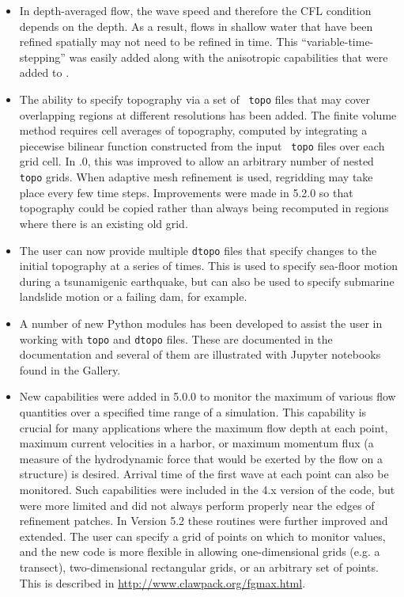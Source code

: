 \begin{itemize}
\item In depth-averaged flow, the wave speed and therefore the CFL
condition depends on the depth.  As a result, flows in shallow water
that have been refined spatially may not need to be refined in time.
This ``variable-time-stepping'' was easily added along with the anisotropic
capabilities that were added to \amrclaw.
\item The ability to specify topography via a set of {\tt
topo} files that may cover overlapping regions at different resolutions has been added.
 The finite volume method requires cell averages of topography, computed by
integrating a piecewise bilinear function constructed from the input {\tt
topo} files over each grid cell.  In .0, this was improved to
allow an arbitrary number of nested {\tt topo} grids.
When adaptive mesh refinement is used,
regridding may take place every few time steps.  Improvements were made
in 5.2.0 so that topography could be copied rather than always being
recomputed in regions where there is an existing old grid.

\item The user can now provide multiple  {\tt dtopo} files that
specify changes to the
initial topography at a series of times.  This is used to specify sea-floor
motion during a tsunamigenic earthquake, but can also be used to specify
submarine landslide motion or a failing dam, for example.

\item A number of new Python modules has been developed to assist the user
in working with {\tt topo} and {\tt dtopo} files.  These are documented in
the \clawpack documentation and several of them are illustrated with Jupyter
notebooks found in the \clawpack Gallery.

\item New capabilities were added in 5.0.0 to monitor the maximum of
various flow quantities over a specified time range of a simulation.
This capability is crucial for many applications where the maximum
flow depth at each point, maximum current velocities in a harbor, or
maximum momentum flux (a measure of the hydrodynamic force that would
be exerted by the flow on a structure) is desired.  Arrival time of
the first wave at each point can also be monitored.  Such
capabilities were included in the 4.x version of the code, but were
more limited and did not always perform properly near the edges of
refinement patches.  In Version 5.2 these routines were further
improved and extended.  The user can specify a grid of points on which
to monitor values, and the new code is more flexible in allowing
one-dimensional grids (e.g. a transect), two-dimensional rectangular
grids, or an arbitrary set of points.  This is described in
\url{http://www.clawpack.org/fgmax.html}.

\end{itemize}

